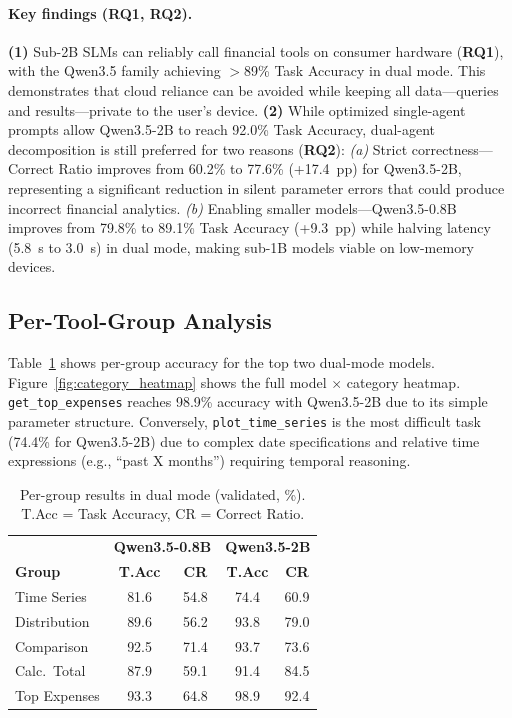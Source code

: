 \documentclass[11pt,twocolumn]{article}
\begin{document}
\paragraph{Key findings (RQ1, RQ2).}
\textbf{(1)} Sub-2B SLMs can reliably call financial tools on consumer
hardware (\textbf{RQ1}), with the Qwen3.5 family achieving $>$89\%
Task Accuracy in dual mode.
This demonstrates that cloud reliance can be avoided while keeping
all data---queries and results---private to the user's device.
\textbf{(2)} While optimized single-agent prompts allow Qwen3.5-2B to
reach 92.0\% Task Accuracy, dual-agent decomposition is still
preferred for two reasons (\textbf{RQ2}):
\emph{(a)} Strict correctness---Correct Ratio improves from 60.2\%
to 77.6\% (+17.4~pp) for Qwen3.5-2B, representing a significant
reduction in silent parameter errors that could produce incorrect
financial analytics.
\emph{(b)} Enabling smaller models---Qwen3.5-0.8B improves from
79.8\% to 89.1\% Task Accuracy (+9.3~pp) while halving latency
(5.8~s to 3.0~s) in dual mode, making sub-1B models viable on
low-memory devices.

\subsection{Per-Tool-Group Analysis}

Table~\ref{tab:category_results} shows per-group accuracy for the top
two dual-mode models.
Figure~\ref{fig:category_heatmap} shows the full model $\times$
category heatmap.
\texttt{get\_top\_expenses} reaches 98.9\% accuracy with Qwen3.5-2B
due to its simple parameter structure.
Conversely, \texttt{plot\_time\_series} is the most difficult task
(74.4\% for Qwen3.5-2B) due to complex date specifications and
relative time expressions (e.g., ``past X months'') requiring
temporal reasoning.

\begin{table}[t]
\centering
\small
\begin{tabular}{@{}l|cc|cc@{}}
\toprule
& \multicolumn{2}{c|}{\textbf{Qwen3.5-0.8B}} &
  \multicolumn{2}{c}{\textbf{Qwen3.5-2B}} \\
\textbf{Group} & \textbf{T.Acc} & \textbf{CR} &
                 \textbf{T.Acc} & \textbf{CR} \\
\midrule
Time Series  & 81.6 & 54.8 & 74.4 & 60.9 \\
Distribution & 89.6 & 56.2 & 93.8 & 79.0 \\
Comparison   & 92.5 & 71.4 & 93.7 & 73.6 \\
Calc.\ Total & 87.9 & 59.1 & 91.4 & 84.5 \\
Top Expenses & 93.3 & 64.8 & 98.9 & 92.4 \\
\bottomrule
\end{tabular}
\caption{Per-group results in dual mode (validated, \%). T.Acc =
Task Accuracy, CR = Correct Ratio.}
\label{tab:category_results}
\end{table}
\end{document}
